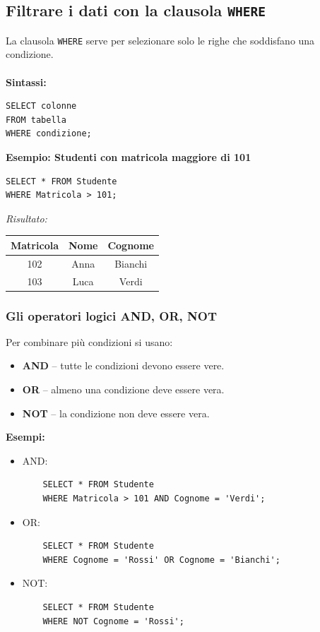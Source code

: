 \documentclass[a4paper,12pt]{article}
\newcommand{\code}[1]{\texttt{#1}}
\begin{document}
\subsection{Filtrare i dati con la clausola \code{WHERE}}
La clausola \code{WHERE} serve per selezionare solo le righe che soddisfano una condizione.\\\\
\textbf{Sintassi:}
\begin{verbatim}
SELECT colonne
FROM tabella
WHERE condizione;
\end{verbatim}
\textbf{Esempio: Studenti con matricola maggiore di 101}
\begin{verbatim}
SELECT * FROM Studente
WHERE Matricola > 101;
\end{verbatim}

\textit{Risultato:}
\begin{center}
\begin{tabular}{|c|c|c|}
\hline
Matricola & Nome & Cognome \\
\hline
102 & Anna & Bianchi \\
103 & Luca & Verdi \\
\hline
\end{tabular}
\end{center}

\subsubsection{Gli operatori logici AND, OR, NOT}
Per combinare più condizioni si usano:

\begin{itemize}
    \item \textbf{AND} -- tutte le condizioni devono essere vere.
    \item \textbf{OR} -- almeno una condizione deve essere vera.
    \item \textbf{NOT} -- la condizione non deve essere vera.
\end{itemize}
\textbf{Esempi:}
\begin{itemize}
    \item AND:
    \begin{verbatim}
    SELECT * FROM Studente
    WHERE Matricola > 101 AND Cognome = 'Verdi';
    \end{verbatim}

    \item OR:
    \begin{verbatim}
    SELECT * FROM Studente
    WHERE Cognome = 'Rossi' OR Cognome = 'Bianchi';
    \end{verbatim}

    \item NOT:
    \begin{verbatim}
    SELECT * FROM Studente
    WHERE NOT Cognome = 'Rossi';
    \end{verbatim}
\end{itemize}
\end{document}
